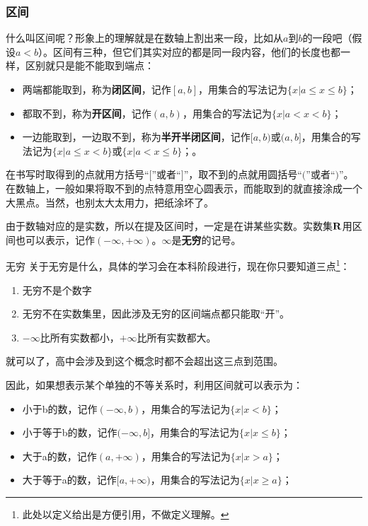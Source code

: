\subsubsection{区间}

什么叫区间呢？形象上的理解就是在数轴上割出来一段，比如从$a$到$b$的一段吧（假设$a<b$）。区间有三种，但它们其实对应的都是同一段内容，他们的长度也都一样，区别就只是能不能取到端点：
\begin{itemize}
\item 两端都能取到，称为\textbf{闭区间}，记作$[a,b]$，用集合的写法记为$\{x|a\leq x\leq b\}$；
\item 都取不到，称为\textbf{开区间}，记作$(a,b)$，用集合的写法记为$\{x|a< x<b\}$；
\item 一边能取到，一边取不到，称为\textbf{半开半闭区间}，记作$[a,b)$或$(a,b]$，用集合的写法记为$\{x|a\leq x< b\}$或$\{x|a< x\leq b\}$；。
\end{itemize}
在书写时取得到的点就用方括号“$[$”或者“$]$”，取不到的点就用圆括号“$($”或者“$)$”。
在数轴上，一般如果将取不到的点特意用空心圆表示，而能取到的就直接涂成一个大黑点。当然，也别太大太用力，把纸涂坏了。
\addTODO{画个数轴的图，[-1,2)的区间}

由于数轴对应的是实数，所以在提及区间时，一定是在讲某些实数。实数集${\rm \mathbf{R}}$用区间也可以表示，记作$(-\infty,+\infty)$。$\infty$是\textbf{无穷}的记号。
\begin{definition}{无穷}
关于无穷是什么，具体的学习会在本科阶段进行，现在你只要知道三点\footnote{此处以定义给出是方便引用，不做定义理解。}：
\begin{enumerate}
\item 无穷不是个数字
\item 无穷不在实数集里，因此涉及无穷的区间端点都只能取“开”。
\item $-\infty$比所有实数都小，$+\infty$比所有实数都大。
\end{enumerate}
就可以了，高中会涉及到这个概念时都不会超出这三点到范围。
\end{definition}

因此，如果想表示某个单独的不等关系时，利用区间就可以表示为：
\begin{itemize}
\item 小于b的数，记作$(-\infty,b)$，用集合的写法记为$\{x|x< b\}$；
\item 小于等于b的数，记作$(-\infty,b]$，用集合的写法记为$\{x|x\leq b\}$；
\item 大于a的数，记作$(a,+\infty)$，用集合的写法记为$\{x|x> a\}$；
\item 大于等于a的数，记作$[a,+\infty)$，用集合的写法记为$\{x|x\geq a\}$；
\end{itemize}

